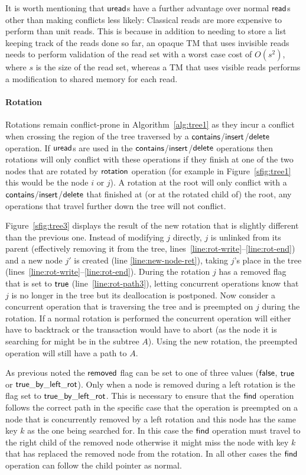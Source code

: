 It is worth mentioning that $\act{uread}$s have a further advantage over normal $\act{read}$s other than making conflicts less likely:
Classical reads are more expensive to perform than unit reads.
This is because in addition to needing to store a list keeping track of the reads done so far, 
an opaque TM that uses invisible reads needs to perform validation of the read set with a worst case cost of 
$O(s^2)$,
where $s$ is the size of the read set, whereas a TM that uses visible reads performs a modification to shared memory for each read.

\paragraph{Rotation}
Rotations remain conflict-prone in Algorithm~\ref{alg:tree1} as they incur a conflict when crossing the region of the tree traversed by a  $\act{contains}$/$\act{insert}$/$\act{delete}$ operation. 
If $\act{uread}$s are used in the $\act{contains}$/$\act{insert}$/$\act{delete}$ operations then rotations will only conflict with these operations if they
finish at one of the two nodes that are rotated by $\act{rotation}$ operation
(for example in Figure~\ref{sfig:tree1} this would be the node $i$ or $j$).
A rotation at the root will only conflict with a $\act{contains}$/$\act{insert}$/$\act{delete}$ that finished at (or at the rotated child of) the root, any operations that travel further down the tree will not conflict.

Figure~\ref{sfig:tree3} displays the result of the new rotation that is slightly different than the previous one.
Instead of modifying $j$ directly, $j$ is unlinked from its parent (effectively removing it from the tree, lines~\ref{line:rot-write}--\ref{line:rot-end})
and a new node $j'$ is created (line \ref{line:new-node-ret}), taking $j$'s place in the tree (lines~\ref{line:rot-write}--\ref{line:rot-end}).
During the rotation $j$ has a removed flag that is set to $\lit{true}$ (line~\ref{line:rot-path3}), letting concurrent operations know that $j$ is no longer in the tree but its deallocation is postponed. 
Now consider a concurrent operation that is traversing the tree and is preempted on $j$ during the rotation.
If a normal rotation is performed the concurrent operation will either have to backtrack or the transaction would have to abort (as the node it is searching for might be in the subtree $A$).
Using the new rotation, the preempted operation will still have a path to $A$.

As previous noted the $\lit{removed}$ flag can be set to one of three values ($\lit{false}$, $\lit{true}$ or $\lit{true\_by\_left\_rot}$).
Only when a node is removed during a left rotation is the flag set to $\lit{true\_by\_left\_rot}$.
This is necessary to ensure that the $\act{find}$ operation follows the correct path in the specific case that the operation is preempted on a node that is concurrently removed by a
left rotation and this node has the same key $k$ as the one being searched for.
In this case the $\act{find}$ operation must travel to the right child of the removed node otherwise it might miss the node with key $k$ that
has replaced the removed node from the rotation.
In all other cases the $\act{find}$ operation can follow the child pointer as normal.

